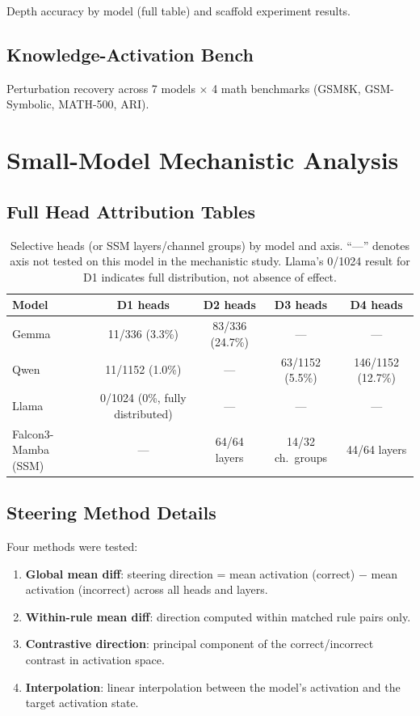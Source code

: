 \documentclass[11pt]{article}
\newcommand{\tighttable}{\setlength{\tabcolsep}{4pt}\renewcommand{\arraystretch}{1.05}}
\begin{document}
Depth accuracy by model (full table) and scaffold experiment results.

\subsection{Knowledge-Activation Bench}
\label{app:kab}

Perturbation recovery across 7 models $\times$ 4 math benchmarks
(GSM8K, GSM-Symbolic, MATH-500, ARI).

\section{Small-Model Mechanistic Analysis}
\label{app:mechanistic}

\subsection{Full Head Attribution Tables}
\label{app:heads}

\begin{table}[H]
\centering\small\tighttable
\begin{tabular}{lcccc}
\toprule
\textbf{Model} & \textbf{D1 heads} & \textbf{D2 heads} & \textbf{D3 heads} & \textbf{D4 heads} \\
\midrule
Gemma & 11/336 (3.3\%) & 83/336 (24.7\%) & --- & --- \\
Qwen  & 11/1152 (1.0\%) & --- & 63/1152 (5.5\%) & 146/1152 (12.7\%) \\
Llama & 0/1024 (0\%, fully distributed) & --- & --- & --- \\
Falcon3-Mamba (SSM) & --- & 64/64 layers & 14/32 ch.\ groups & 44/64 layers \\
\bottomrule
\end{tabular}
\caption{Selective heads (or SSM layers/channel groups) by model and
axis. ``---'' denotes axis not tested on this model in the mechanistic
study. Llama's 0/1024 result for D1 indicates full distribution, not
absence of effect.}
\label{tab:head-attr}
\end{table}

\subsection{Steering Method Details}
\label{app:steering}

Four methods were tested:
\begin{enumerate}[noitemsep, topsep=2pt]
\item \textbf{Global mean diff}: steering direction = mean activation
(correct) $-$ mean activation (incorrect) across all heads and layers.
\item \textbf{Within-rule mean diff}: direction computed within matched
rule pairs only.
\item \textbf{Contrastive direction}: principal component of the
correct/incorrect contrast in activation space.
\item \textbf{Interpolation}: linear interpolation between the
model's activation and the target activation state.
\end{enumerate}
\end{document}
